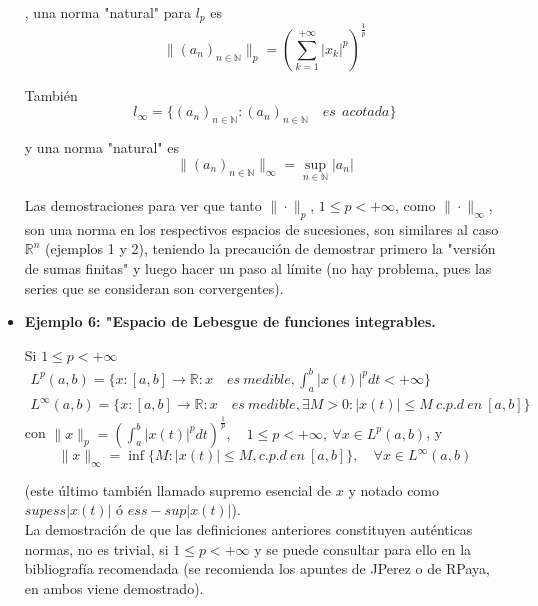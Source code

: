 \documentclass{article}
\begin{document}
\begin{itemize}
, una norma "natural" para $l_p$ es
\begin{equation*}
\|(a_n)_{n\in\mathbb{N}}\|_p=\left(\sum_{k=1}^{+\infty}|x_k|^p\right)^\frac{1}{p}
\end{equation*}

También 
\begin{equation*}
l_\infty=\{(a_n)_{n\in \mathbb{N}}:(a_n)_{n\in\mathbb{N}}\quad es\:\:acotada\}
\end{equation*}

y una norma "natural" es
\begin{equation*}
\|(a_n)_{n\in \mathbb{N}}\|_\infty=\sup_{n\in\mathbb{N}}|a_n|
\end{equation*}

Las demostraciones para ver que tanto $\|\cdot\|_p$, $1\leq p<+\infty$, como $\|\cdot\|_\infty$, son una norma en los respectivos espacios de sucesiones, son similares al caso $\mathbb{R}^n$ (ejemplos 1 y 2), teniendo la precaución de demostrar primero la "versión de sumas finitas" y luego hacer un paso al límite (no hay problema, pues las series que se consideran son corvergentes).

\item \textbf{Ejemplo 6: "Espacio de Lebesgue de funciones integrables.}

Si $1\leq p<+\infty$
\begin{gather*}
L^p(a,b)=\{x:[a,b]\rightarrow \mathbb{R}:x\quad es\:medible,\int_a^b|x(t)|^p dt<+\infty\}\\
L^\infty(a,b)=\{x:[a,b]\rightarrow \mathbb{R}:x\quad es\:medible,\exists M>0:|x(t)|\leq M\:c.p.d\:en\:[a,b]\}
\end{gather*}
con $\|x\|_p=\left(\int_a^b|x(t)|^p dt\right)^\frac{1}{p},\quad 1\leq p<+\infty,\:\forall x\in L^p(a,b)$, y 
\begin{equation*}
\|x\|_\infty =\inf\{M:|x(t)|\leq M,c.p.d\:en\:[a,b]\},\quad \forall x\in L^\infty(a,b)
\end{equation*}

(este último también llamado supremo esencial de $x$ y notado como $supess|x(t)|$ ó $ess-sup|x(t)|$).\\

La demostración de que las definiciones anteriores constituyen auténticas normas, no es trivial, si $1\leq p<+\infty$ y se puede consultar para ello en la bibliografía recomendada (se recomienda los apuntes de JPerez o de RPaya, en ambos viene demostrado).
\end{itemize}
\end{document}
